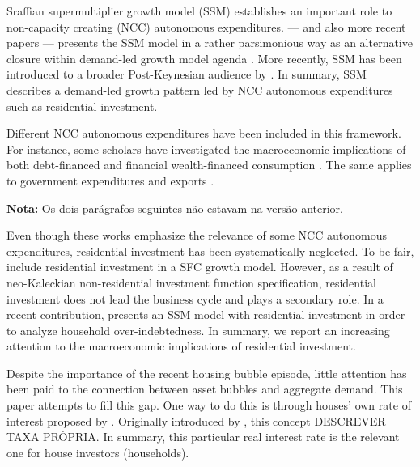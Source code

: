\documentclass[11pt]{article}
\begin{document}
Sraffian supermultiplier growth model (SSM) establishes an important role to non-capacity creating (NCC) autonomous expenditures.
\textcite{serrano_long_1995} --- and also more recent papers \cite{freitas_growth_2015} --- presents the SSM model in a rather parsimonious way as an alternative closure within demand-led growth model agenda \cite{serrano_sraffian_2017}.
More recently, SSM has been introduced to a broader Post-Keynesian audience by \textcites{allain_tackling_2015}{lavoie_post-keynesian_2015}{lavoie_convergence_2016}.
In summary,  SSM describes a demand-led growth pattern led by NCC autonomous expenditures such as residential investment.


Different NCC autonomous expenditures have been included in this framework. 
For instance, some scholars have investigated the macroeconomic implications of both debt-financed \cites{pariboni_autonomous_2015}{fagundes_role_2017}{mandarino-2020-worker-debt} and financial wealth-financed consumption \cite{brochier_supermultiplier_2018}.
The same applies to government expenditures \cites{allain_tackling_2015}{bougrine_autonomous_2020} and exports \cite{nah_long-run_2017}.

\textbf{Nota:} Os dois parágrafos seguintes não estavam na versão anterior.

Even though these works emphasize the relevance of some NCC autonomous expenditures, residential investment has been systematically neglected.
To be fair, \textcites{zezza_u.s._2008}{nikolaidi_securitisation_2015} include residential investment in a SFC growth model.
However, as a result of neo-Kaleckian non-residential investment function specification, residential investment does not lead the business cycle and plays a secondary role.
In a recent contribution, \textcite{dejuan_supermultiplier-cum-finance_2018} presents an SSM model with residential investment in order to analyze household over-indebtedness.
In summary, we report an increasing attention to the macroeconomic implications of residential investment.

Despite the importance of the recent housing bubble episode, little attention has been paid to the connection between asset bubbles and aggregate demand.
This paper attempts to fill this gap. 
One way to do this is through houses' own rate of interest proposed by \textcite{teixeira_crescimento_2015}.
Originally introduced by \textcite{Sraffa_Own_1932}, this concept DESCREVER TAXA PRÓPRIA.
In summary, this particular real interest rate is the relevant one for house investors (households). 
\end{document}
